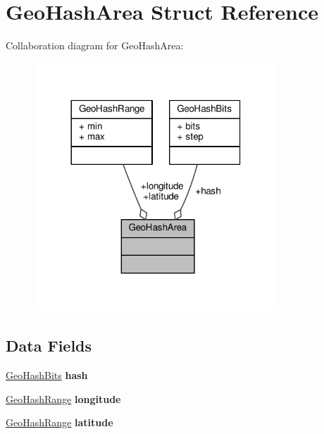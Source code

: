 \hypertarget{structGeoHashArea}{}\section{Geo\+Hash\+Area Struct Reference}
\label{structGeoHashArea}


Collaboration diagram for Geo\+Hash\+Area\+:\nopagebreak
\begin{figure}[H]
\begin{center}
\leavevmode
\includegraphics[width=260pt]{structGeoHashArea__coll__graph}
\end{center}
\end{figure}
\subsection*{Data Fields}
\begin{DoxyCompactItemize}
\item 
\mbox{\label{structGeoHashArea_a34e84c608242e72dac8643104a51e0e1}} 
\hyperlink{structGeoHashBits}{Geo\+Hash\+Bits} {\bfseries hash}
\item 
\mbox{\label{structGeoHashArea_a5c5319cf44c7f8181d5883d01055ef62}} 
\hyperlink{structGeoHashRange}{Geo\+Hash\+Range} {\bfseries longitude}
\item 
\mbox{\label{structGeoHashArea_a7ca5883bf7c8b3404743d3618b3f62c2}} 
\hyperlink{structGeoHashRange}{Geo\+Hash\+Range} {\bfseries latitude}
\end{DoxyCompactItemize}


